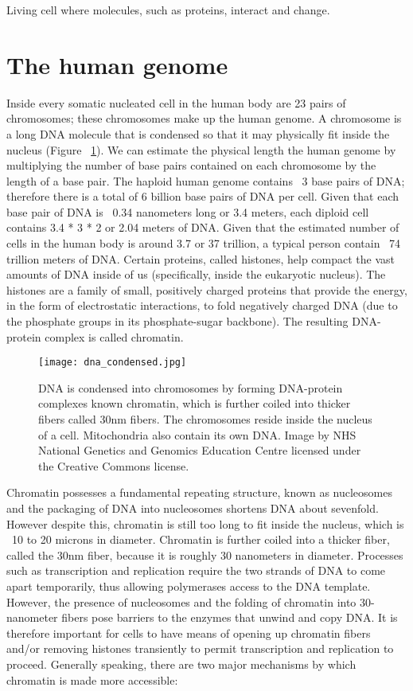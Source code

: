 Living cell where molecules, such as proteins, interact and change.

\section{The human genome}

Inside every somatic nucleated cell in the human body are 23 pairs of chromosomes; these chromosomes make up the human genome. A chromosome is a long DNA molecule that is condensed so that it may physically fit inside the nucleus (Figure ~\ref{fig:dna_condensed}). We can estimate the physical length the human genome by multiplying the number of base pairs contained on each chromosome by the length of a base pair. The haploid human genome contains ~3 base pairs of DNA; therefore there is a total of 6 billion base pairs of DNA per cell. Given that each base pair of DNA is ~0.34 nanometers long or 3.4 meters\cite{pmid7354864}, each diploid cell contains 3.4 * 3 * 2 or 2.04 meters of DNA. Given that the estimated number of cells in the human body is around 3.7 or 37 trillion\cite{pmid23829164}, a typical person contain ~74 trillion meters of DNA. Certain proteins, called histones, help compact the vast amounts of DNA inside of us (specifically, inside the eukaryotic nucleus). The histones are a family of small, positively charged proteins that provide the energy, in the form of electrostatic interactions, to fold negatively charged DNA (due to the phosphate groups in its phosphate-sugar backbone). The resulting DNA-protein complex is called chromatin.

\begin{figure}[h]
   \centering
   \texttt{[image: dna\_condensed.jpg]}
   \caption[Condensation of DNA]{DNA is condensed into chromosomes by forming DNA-protein complexes known chromatin, which is further coiled into thicker fibers called 30nm fibers. The chromosomes reside inside the nucleus of a cell. Mitochondria also contain its own DNA. Image by NHS National Genetics and Genomics Education Centre licensed under the Creative Commons license.}
   \label{fig:dna_condensed}
\end{figure}

Chromatin possesses a fundamental repeating structure\cite{holde01111974}, known as nucleosomes and the packaging of DNA into nucleosomes shortens DNA about sevenfold. However despite this, chromatin is still too long to fit inside the nucleus, which is ~10 to 20 microns in diameter. Chromatin is further coiled into a thicker fiber, called the 30nm fiber, because it is roughly 30 nanometers in diameter. Processes such as transcription and replication require the two strands of DNA to come apart temporarily, thus allowing polymerases access to the DNA template. However, the presence of nucleosomes and the folding of chromatin into 30-nanometer fibers pose barriers to the enzymes that unwind and copy DNA. It is therefore important for cells to have means of opening up chromatin fibers and/or removing histones transiently to permit transcription and replication to proceed. Generally speaking, there are two major mechanisms by which chromatin is made more accessible:


